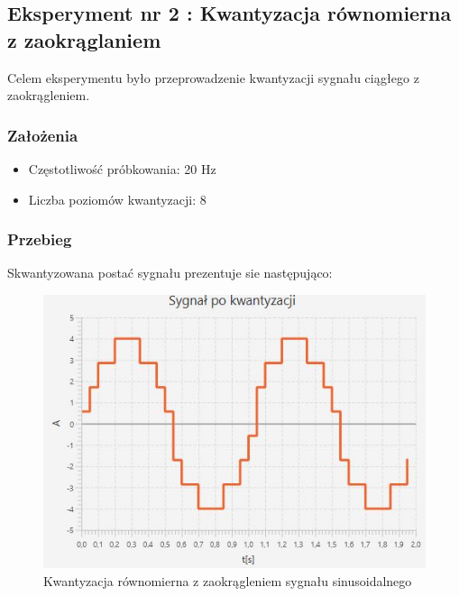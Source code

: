 \documentclass[12pt]{article}
\begin{document}

\newpage
\subsection{Eksperyment nr 2 : Kwantyzacja równomierna z zaokrąglaniem}

Celem eksperymentu było przeprowadzenie kwantyzacji sygnału ciągłego z zaokrągleniem.

\subsubsection{Założenia}

\begin{itemize}
	\item Częstotliwość próbkowania: 20 Hz
	\item Liczba poziomów kwantyzacji: 8
\end{itemize}
\subsubsection{Przebieg}
Skwantyzowana postać sygnału prezentuje sie następująco:
\begin{figure}[H]
	\centering
	\includegraphics[width=\linewidth]{sygnal_kwantyzacja_z_zaokragleniem.jpg}
	\caption{Kwantyzacja równomierna z zaokrągleniem sygnału sinusoidalnego}
	\label{wykres dla eksperymentu 2}
\end{figure}
\end{document}
